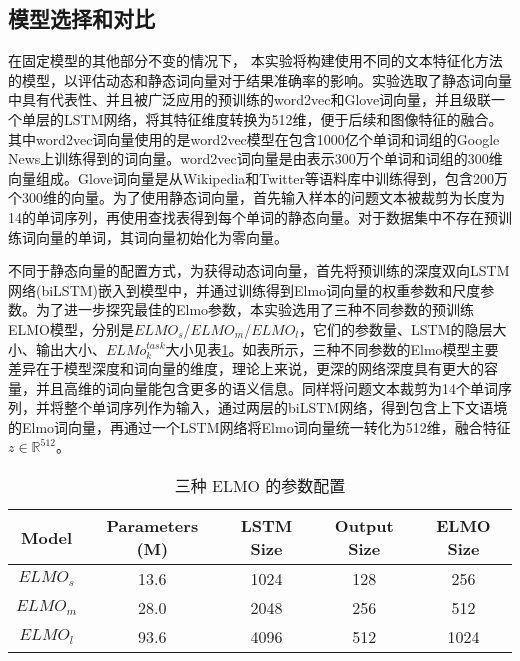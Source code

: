 \subsection{模型选择和对比}

在固定模型的其他部分不变的情况下， 本实验将构建使用不同的文本特征化方法的模型，以评估动态和静态词向量对于结果准确率的影响。实验选取了静态词向量中具有代表性、并且被广泛应用的预训练的word2vec和Glove词向量，并且级联一个单层的LSTM网络，将其特征维度转换为512维，便于后续和图像特征的融合。其中word2vec词向量使用的是word2vec模型在包含1000亿个单词和词组的Google News上训练得到的词向量。word2vec词向量是由表示300万个单词和词组的300维向量组成。Glove词向量是从Wikipedia和Twitter等语料库中训练得到，包含200万个300维的向量。为了使用静态词向量，首先输入样本的问题文本被裁剪为长度为14的单词序列，再使用查找表得到每个单词的静态向量。对于数据集中不存在预训练词向量的单词，其词向量初始化为零向量。

不同于静态向量的配置方式，为获得动态词向量，首先将预训练的深度双向LSTM网络(biLSTM)嵌入到模型中，并通过训练得到Elmo词向量的权重参数和尺度参数。为了进一步探究最佳的Elmo参数，本实验选用了三种不同参数的预训练ELMO模型，分别是$ELMO_s$/$ELMO_m$/$ELMO_l$，它们的参数量、LSTM的隐层大小、输出大小、$ELMo_k^{task}$大小见表\ref{ELMO_models}。如表所示，三种不同参数的Elmo模型主要差异在于模型深度和词向量的维度，理论上来说，更深的网络深度具有更大的容量，并且高维的词向量能包含更多的语义信息。同样将问题文本裁剪为14个单词序列，并将整个单词序列作为输入，通过两层的biLSTM网络，得到包含上下文语境的Elmo词向量，再通过一个LSTM网络将Elmo词向量统一转化为512维，融合特征$z \in \mathbb{R}^{512}$。
\begin{table}[H]
\centering
\caption{三种 ELMO 的参数配置}
\begin{tabular}{ccccc}
\toprule
Model & Parameters (M) & LSTM Size & Output Size & ELMO Size\\
\midrule
$ELMO_s$&  13.6& 1024&  128& 256\\
$ELMO_m$&  28.0& 2048&  256& 512\\
$ELMO_l$&  93.6& 4096&  512& 1024\\
\bottomrule
\end{tabular}
\label{ELMO_models}
\end{table}

